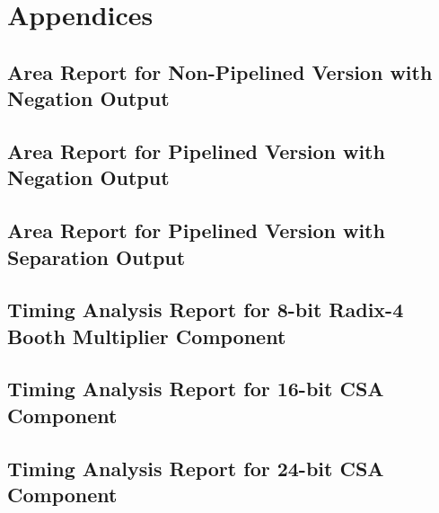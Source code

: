 \section{Appendices}
\subsection{Area Report for Non-Pipelined Version with Negation Output}
\label{sec:ap_1}
{
	\footnotesize{
		
	}
}
\subsection{Area Report for Pipelined Version with Negation Output}
\label{sec:ap_2}

{
	\footnotesize{
		
	}
}
\subsection{Area Report for Pipelined Version with Separation Output}
\label{sec:ap_3}

{
	\footnotesize{
		
	}
}

\subsection{Timing Analysis Report for 8-bit Radix-4 Booth Multiplier Component}
\label{sec:ap_4}

{
	\footnotesize{
		
	}
}

\subsection{Timing Analysis Report for 16-bit CSA Component}
\label{sec:ap_5}

{
	\footnotesize{
		
	}
}

\subsection{Timing Analysis Report for 24-bit CSA Component}
\label{sec:ap_6}

{
	\footnotesize{
		
	}
}

